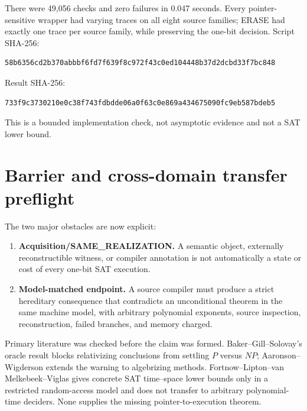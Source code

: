 \documentclass[11pt]{article}
\begin{document}
There were 49,056 checks and zero failures in 0.047 seconds.  Every pointer-sensitive wrapper had varying traces on all eight source families; ERASE had exactly one trace per source family, while preserving the one-bit decision.  Script SHA-256:
\begin{verbatim}
58b6356cd2b370abbbf6fd7f639f8c972f43c0ed104448b37d2dcbd33f7bc848
\end{verbatim}
Result SHA-256:
\begin{verbatim}
733f9c3730210e0c38f743fdbdde06a0f63c0e869a434675090fc9eb587bdeb5
\end{verbatim}
This is a bounded implementation check, not asymptotic evidence and not a SAT lower bound.

\section{Barrier and cross-domain transfer preflight}

The two major obstacles are now explicit:
\begin{enumerate}
\item \textbf{Acquisition/SAME\_REALIZATION.}  A semantic object, externally reconstructible witness, or compiler annotation is not automatically a state or cost of every one-bit SAT execution.
\item \textbf{Model-matched endpoint.}  A source compiler must produce a strict hereditary consequence that contradicts an unconditional theorem in the same machine model, with arbitrary polynomial exponents, source inspection, reconstruction, failed branches, and memory charged.
\end{enumerate}

Primary literature was checked before the claim was formed.  Baker--Gill--Solovay's oracle result blocks relativizing conclusions from settling $P$ versus $NP$; Aaronson--Wigderson extends the warning to algebrizing methods.  Fortnow--Lipton--van Melkebeek--Viglas gives concrete SAT time--space lower bounds only in a restricted random-access model and does not transfer to arbitrary polynomial-time deciders.  None supplies the missing pointer-to-execution theorem.
\end{document}
